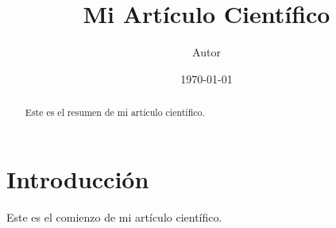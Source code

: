 \documentclass[aps,prl,twocolumn,12pt]{revtex4-2}
\begin{document}
\title{Mi Artículo Científico}
\author{Autor}
\date{\today}
\begin{abstract}
Este es el resumen de mi artículo científico.
\end{abstract}
\maketitle
\section{Introducción}
Este es el comienzo de mi artículo científico.
\end{document}
